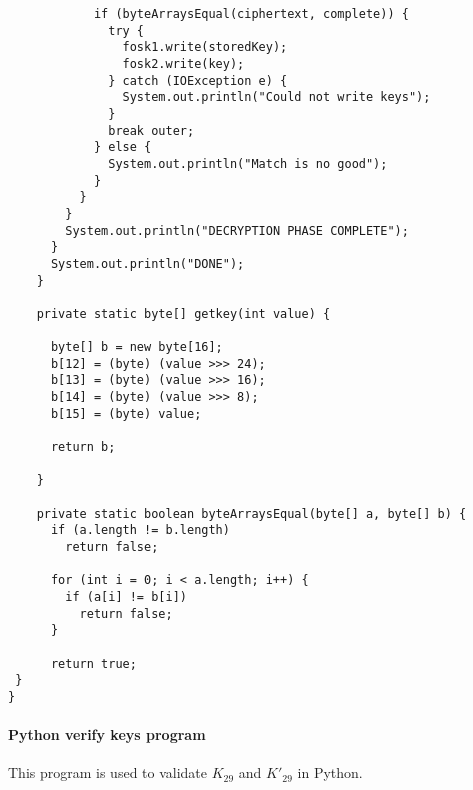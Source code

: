 \documentclass[11pt]{article}
\begin{document}
\begin{verbatim}
	        if (byteArraysEqual(ciphertext, complete)) {
	          try {
	            fosk1.write(storedKey);
	            fosk2.write(key);
	          } catch (IOException e) {
	            System.out.println("Could not write keys");
	          }
	          break outer;
	        } else {
	          System.out.println("Match is no good");
	        }
	      }
	    }
	    System.out.println("DECRYPTION PHASE COMPLETE");
	  }
	  System.out.println("DONE");
	}

	private static byte[] getkey(int value) {

	  byte[] b = new byte[16];
	  b[12] = (byte) (value >>> 24);
	  b[13] = (byte) (value >>> 16);
	  b[14] = (byte) (value >>> 8);
	  b[15] = (byte) value;

	  return b;

	}

	private static boolean byteArraysEqual(byte[] a, byte[] b) {
	  if (a.length != b.length)
	    return false;

	  for (int i = 0; i < a.length; i++) {
	    if (a[i] != b[i])
	      return false;
	  }

	  return true;
 }
}

\end{verbatim}

\paragraph{Python verify keys program}
\begin{flushleft}
This program is used to validate $K_{29}$ and $K'_{29}$ in Python.
\end{flushleft}
\end{document}
